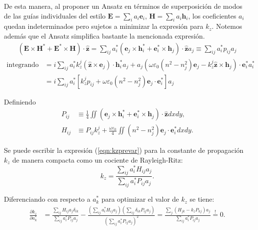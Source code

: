 De esta manera, al proponer un Ansatz en términos de superposición de modos de las guías individuales del estilo $\textbf{E} = \sum_i a_i \textbf{e}_i$, $\textbf{H} = \sum_i a_i \textbf{h}_i$, los coeficientes $a_i$ quedan indeterminados pero sujetos a minimizar la expresión para $k_z$. Notemos además que el Ansatz simplifica bastante la mencionada expresión.
\begin{align*}
	(\textbf{E}\times\textbf{H}^* + \textbf{E}^*\times\textbf{H})\cdot\hat{\textbf{z}} = \sum_{ij} a_i^*( \textbf{e}_j \times  \textbf{h}_i^* + \textbf{e}_i^* \times  \textbf{h}_j  )\cdot\hat{\textbf{z}} a_j \equiv \sum_{ij} a_i^* p_{ij} a_j
\end{align*}
\begin{align*}
	\text{integrando numerador} &= i\sum_{ij} a_i^* k_z^j (\hat{\textbf{z}}\times\textbf{e}_j )\cdot\textbf{h}_i^* a_j + a_j\left(\omega \varepsilon_0 (n^2-n_j^2) \textbf{e}_j-k_z^j \hat{\textbf{z}}\times\textbf{h}_j \right)\cdot \textbf{e}_i^* a_i^*
	\\
	&= i\sum_{ij}  a_i^*\left[ k_z^j p_{ij}  +  \omega \varepsilon_0(n^2-n_j^2) \textbf{e}_j \cdot \textbf{e}_i^* \right] a_j
\end{align*}

Definiendo 
\begin{align}
	P_{ij} &\equiv \frac{1}{4} \iint ( \textbf{e}_j \times  \textbf{h}_i^* + \textbf{e}_i^* \times  \textbf{h}_j  )\cdot\hat{\textbf{z}} dxdy,
	\\
	H_{ij} &\equiv  P_{ij} k_z^j + \frac{\omega \varepsilon_0}{4} \iint(n^2-n_j^2) \textbf{e}_j \cdot \textbf{e}_i^* dxdy.
\end{align}

Se puede escribir la expresión (\ref{eqn:kzprevar}) para la constante de propagación $k_z$ de manera compacta como un cociente de Rayleigh-Ritz:
\begin{equation}
	k_z = \frac{\sum_{ij} a_i^* H_{ij} a_j}{\sum_{ij} a_i^*P_{ij} a_j}.
\end{equation}

Diferenciando con respecto a $a_k^*$ para optimizar el valor de $k_z$ se tiene:
\begin{align}
	\frac{\partial k_z}{\partial a_k^*} &= \frac{\sum_{ij} H_{ij} a_j \delta_{ik}}{\sum_{ij} a_i^*P_{ij} a_j} - \frac{\left(\sum_{ij} a_i^* H_{ij} a_j\right) \left( 
	\sum_{ij} \delta_{ik} P_{ij} a_j \right) }{\left(\sum_{ij} a_i^*P_{ij} a_j\right)^2} = \frac{\sum_{j} \left(H_{jk}  - k_z P_{kj} \right) a_j}{\sum_{ij} a_i^* P_{ij}a_j} \overset{!}{=} 0.
\end{align}

